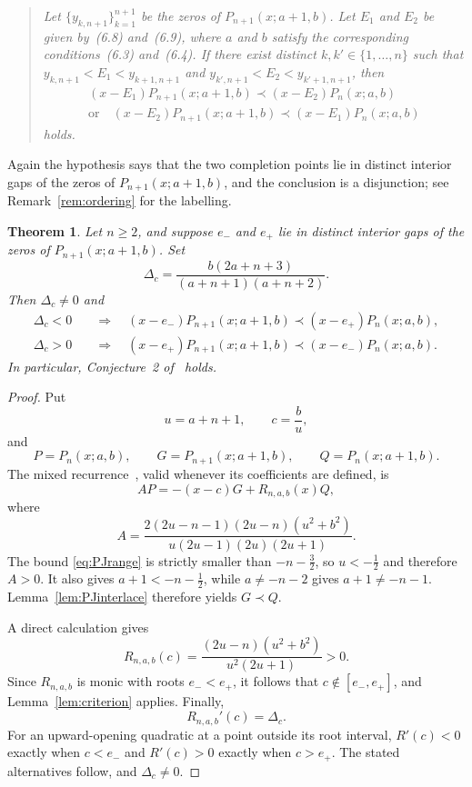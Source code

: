 \documentclass[11pt]{amsart}
\newtheorem{theorem}{Theorem}[section]
\theoremstyle{remark}
\begin{document}
\begin{quote}
\emph{Let $\{y_{k,n+1}\}_{k=1}^{n+1}$ be the zeros of
$P_{n+1}(x;a+1,b)$. Let $E_1$ and $E_2$ be given by~\textup{(6.8)}
and~\textup{(6.9)}, where $a$ and $b$ satisfy the corresponding
conditions~\textup{(6.3)} and~\textup{(6.4)}.  If there exist distinct
$k, k' \in \{1, \dots, n\}$ such that $y_{k,n+1} < E_1 < y_{k+1,n+1}$ and
$y_{k',n+1} < E_2 < y_{k'+1,n+1}$, then
\begin{gather*}
 (x-E_1) P_{n+1}(x;a+1,b) \prec (x-E_2)P_{n}(x;a,b)\\
 \text{or}\quad
 (x-E_2)P_{n+1}(x;a+1,b) \prec (x-E_1)P_{n}(x;a,b)
\end{gather*}
holds.}
\end{quote}

\noindent
Again the hypothesis says that the two completion points lie in distinct
interior gaps of the zeros of $P_{n+1}(x;a+1,b)$, and the conclusion is a
disjunction; see Remark~\ref{rem:ordering} for the labelling.

\begin{theorem}\label{thm:PJ}
Let $n\ge2$, and suppose $e_-$ and $e_+$ lie in distinct interior gaps of the
zeros of $P_{n+1}(x;a+1,b)$.  Set
\[
 \Delta_c=\frac{b(2a+n+3)}{(a+n+1)(a+n+2)}.
\]
Then $\Delta_c\ne0$ and
\begin{align*}
 \Delta_c<0
 &\quad\Longrightarrow\quad
 (x-e_-)P_{n+1}(x;a+1,b)
 \prec (x-e_+)P_n(x;a,b),\\
 \Delta_c>0
 &\quad\Longrightarrow\quad
 (x-e_+)P_{n+1}(x;a+1,b)
 \prec (x-e_-)P_n(x;a,b).
\end{align*}
In particular, Conjecture~2 of~\cite{JordaanKumar} holds.
\end{theorem}

\begin{proof}
Put
\[
 u=a+n+1,\qquad c=\frac bu,
\]
and
\[
 P=P_n(x;a,b),\qquad
 G=P_{n+1}(x;a+1,b),\qquad
 Q=P_n(x;a+1,b).
\]
The mixed recurrence~\cite[(6.10)]{JordaanKumar}, valid whenever its
coefficients are defined, is
\begin{equation}\label{eq:PJmixed}
 AP=-(x-c)G+R_{n,a,b}(x)Q,
\end{equation}
where
\[
 A=\frac{2(2u-n-1)(2u-n)(u^2+b^2)}
 {u(2u-1)(2u)(2u+1)}.
\]
The bound \eqref{eq:PJrange} is strictly smaller than $-n-\tfrac32$, so
$u<-\tfrac12$ and therefore $A>0$.  It also gives
$a+1<-n-\tfrac12$, while $a\ne-n-2$ gives $a+1\ne-n-1$.
Lemma~\ref{lem:PJinterlace} therefore yields $G\prec Q$.

A direct calculation gives
\begin{equation}\label{eq:Rc}
 R_{n,a,b}(c)
 =\frac{(2u-n)(u^2+b^2)}{u^2(2u+1)}>0.
\end{equation}
Since $R_{n,a,b}$ is monic with roots $e_-<e_+$, it follows that
$c\notin[e_-,e_+]$, and Lemma~\ref{lem:criterion} applies.  Finally,
\[
 R_{n,a,b}'(c)=\Delta_c.
\]
For an upward-opening quadratic at a point outside its root interval,
$R'(c)<0$ exactly when $c<e_-$ and $R'(c)>0$ exactly when $c>e_+$.
The stated alternatives follow, and $\Delta_c\ne0$.
\end{proof}
\end{document}
